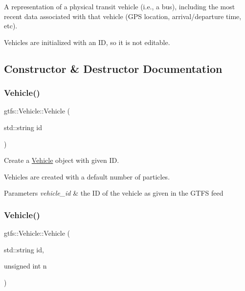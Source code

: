 A representation of a physical transit vehicle (i.\+e., a bus), including the most recent data associated with that vehicle (G\+PS location, arrival/departure time, etc).

Vehicles are initialized with an ID, so it is not editable. 

\subsection{Constructor \& Destructor Documentation}
\mbox{\label{classgtfs_1_1Vehicle_ac3f8111a611378f5f8b29f7465e48919}} 
\subsubsection{\texorpdfstring{Vehicle()}{Vehicle()}\hspace{0.1cm}{\footnotesize\ttfamily [1/2]}}
{\footnotesize\ttfamily gtfs\+::\+Vehicle\+::\+Vehicle (\begin{DoxyParamCaption}\item[{std\+::string}]{id }\end{DoxyParamCaption})}

Create a \hyperlink{classgtfs_1_1Vehicle}{Vehicle} object with given ID.

Vehicles are created with a default number of particles.


\begin{DoxyParams}{Parameters}
{\em vehicle\+\_\+id} & the ID of the vehicle as given in the G\+T\+FS feed \\
\hline
\end{DoxyParams}
\mbox{\label{classgtfs_1_1Vehicle_adf892e71483b7f9005846599fd0308e6}} 
\subsubsection{\texorpdfstring{Vehicle()}{Vehicle()}\hspace{0.1cm}{\footnotesize\ttfamily [2/2]}}
{\footnotesize\ttfamily gtfs\+::\+Vehicle\+::\+Vehicle (\begin{DoxyParamCaption}\item[{std\+::string}]{id,  }\item[{unsigned int}]{n }\end{DoxyParamCaption})}

